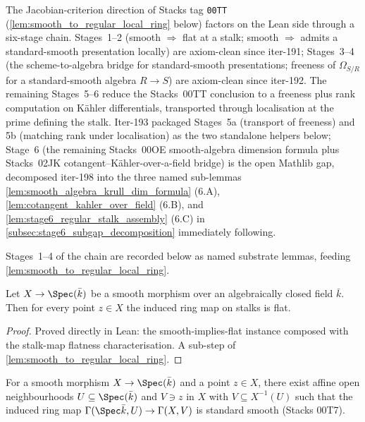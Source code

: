 The Jacobian-criterion direction of Stacks tag \texttt{00TT}
(\cref{lem:smooth_to_regular_local_ring} below) factors on the Lean side
through a six-stage chain. Stages~1--2 (smooth \(\Rightarrow\) flat at a
stalk; smooth \(\Rightarrow\) admits a standard-smooth presentation
locally) are axiom-clean since iter-191; Stages~3--4 (the
scheme-to-algebra bridge for standard-smooth presentations; freeness of
\(\Omega_{S/R}\) for a standard-smooth algebra \(R \to S\)) are
axiom-clean since iter-192. The remaining Stages~5--6 reduce the
Stacks~00TT conclusion to a freeness plus rank computation on K\"ahler
differentials, transported through localisation at the prime defining
the stalk. Iter-193 packaged Stages~5a (transport of freeness) and 5b
(matching rank under localisation) as the two standalone helpers below;
Stage~6 (the remaining Stacks~00OE smooth-algebra dimension formula
plus Stacks~02JK cotangent--K\"ahler-over-a-field bridge) is the open
Mathlib gap, decomposed iter-198 into the three named sub-lemmas
\cref{lem:smooth_algebra_krull_dim_formula} (6.A),
\cref{lem:cotangent_kahler_over_field} (6.B), and
\cref{lem:stage6_regular_stalk_assembly} (6.C) in
\cref{subsec:stage6_subgap_decomposition} immediately following.

Stages~1--4 of the chain are recorded below as named substrate lemmas, feeding
\cref{lem:smooth_to_regular_local_ring}.

\begin{lemma}
  \label{lem:stalkMap_flat_of_smooth}
  Let \(X \to \Spec(\bar k)\) be a smooth morphism over an algebraically closed
  field \(\bar k\). Then for every point \(z \in X\) the induced ring map on
  stalks is flat.
\end{lemma}

\begin{proof}
  Proved directly in Lean: the smooth-implies-flat instance composed with the
  stalk-map flatness characterisation. A sub-step of
  \cref{lem:smooth_to_regular_local_ring}.
\end{proof}

\begin{lemma}
  \label{lem:exists_standardSmooth_at_of_smooth}
  For a smooth morphism \(X \to \Spec(\bar k)\) and a point \(z \in X\), there
  exist affine open neighbourhoods \(U \subseteq \Spec(\bar k)\) and \(V \ni z\)
  in \(X\) with \(V \subseteq X^{-1}(U)\) such that the induced ring map
  \(\Gamma(\Spec \bar k, U) \to \Gamma(X, V)\) is standard smooth (Stacks 00T7).
\end{lemma}

